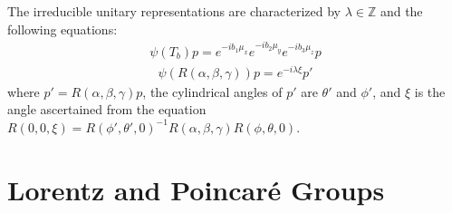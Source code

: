 \documentclass[compress,aspectratio=169,10pt,usenames,dvipsnames]{beamer}
\newcommand{\Z}{\mathbb{Z}}
\begin{document}
\begin{frame}
\vfill
\begin{theorem}
The irreducible unitary representations are characterized by $\lambda\in\Z$ and the following equations:
\begin{equation}
\begin{aligned}
	\psi(T_b) p = e^{-ib_1\mu_x}e^{-ib_2\mu_y}e^{-ib_3\mu_z}p
\end{aligned}
\end{equation}
\begin{equation}
\begin{aligned}
	\psi(R(\alpha,\beta,\gamma)) p = e^{-i\lambda\xi}p'
\end{aligned}
\end{equation}
where $p' = R(\alpha,\beta,\gamma)p$, the cylindrical angles of $p'$ are $\theta'$ and $\phi'$, and $\xi$ is the angle ascertained from the equation $R(0,0,\xi)=R(\phi',\theta',0)^{-1}R(\alpha,\beta,\gamma) R(\phi,\theta,0)$. 
\end{theorem}
\vfill
\end{frame}
%
\section{Lorentz and Poincar\'e Groups}
\begin{frame}
\sectionpage
\end{frame}
\end{document}
